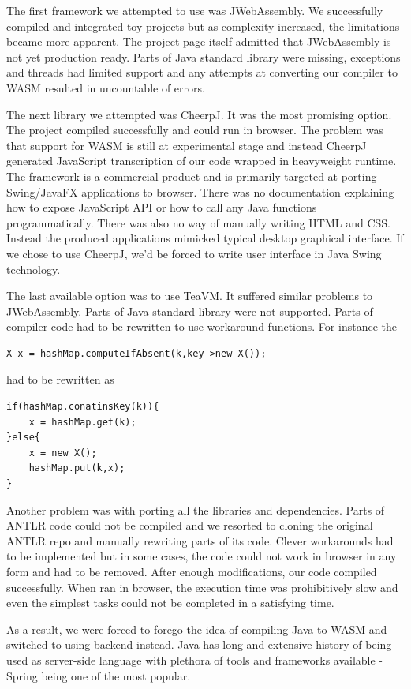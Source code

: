 The first framework we attempted to use was JWebAssembly. We successfully compiled and integrated toy projects but as complexity increased, the limitations became more apparent. The project page itself admitted that JWebAssembly is not yet production ready. Parts of Java standard library were missing, exceptions and threads had limited support and any attempts at converting our compiler to WASM resulted in uncountable of errors.

The next library we attempted was CheerpJ. It was the most promising option. The project compiled successfully and could run in browser. The problem was that support for WASM is still at experimental stage and instead CheerpJ generated JavaScript transcription of our code wrapped in heavyweight runtime. The framework is a commercial product and is primarily targeted at porting Swing/JavaFX applications to browser. There was no documentation explaining how to expose JavaScript API or how to call any Java functions programmatically. There was also no way of manually writing HTML and CSS. Instead the produced applications mimicked typical desktop graphical interface. If we chose to use CheerpJ, we'd be forced to write user interface in Java Swing technology.

The last available option was to use TeaVM\cite{teavm}. It suffered similar problems to JWebAssembly. Parts of Java standard library were not supported. Parts of compiler code had to be rewritten to use workaround functions. For instance
the
\begin{lstlisting}
X x = hashMap.computeIfAbsent(k,key->new X());
\end{lstlisting}
had to be rewritten as
\begin{lstlisting}
if(hashMap.conatinsKey(k)){
    x = hashMap.get(k);
}else{
    x = new X();
    hashMap.put(k,x);
}
\end{lstlisting}
Another problem was with porting all the libraries and dependencies.
Parts of ANTLR\cite{antlr} code could not be compiled and we resorted to cloning the original ANTLR repo and manually rewriting parts of its code. Clever workarounds had to be implemented but in some cases, the code could not work in browser in any form and had to be removed.
After enough modifications, our code compiled successfully.
When ran in browser, the execution time was prohibitively slow and even the simplest tasks could not be completed in a satisfying time.

As a result, we were forced to forego the idea of compiling Java to WASM and switched to using backend instead. Java has long and extensive history of being used as server-side language with plethora of tools and frameworks available - Spring being one of the most popular.